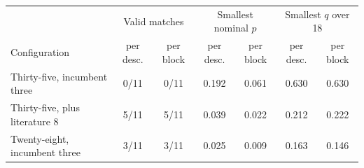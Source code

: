 \begin{tabular}{lcccccc}
\hline
 & \multicolumn{2}{c}{Valid matches} & \multicolumn{2}{c}{Smallest nominal $p$}
 & \multicolumn{2}{c}{Smallest $q$ over 18} \\
Configuration & per desc. & per block & per desc. & per block
 & per desc. & per block \\
\hline
Thirty-five, incumbent three & 0/11 & 0/11 & 0.192 & 0.061 & 0.630 & 0.630 \\
Thirty-five, plus literature 8 & 5/11 & 5/11 & 0.039 & 0.022 & 0.212 & 0.222 \\
Twenty-eight, incumbent three & 3/11 & 3/11 & 0.025 & 0.009 & 0.163 & 0.146 \\
\hline
\end{tabular}
